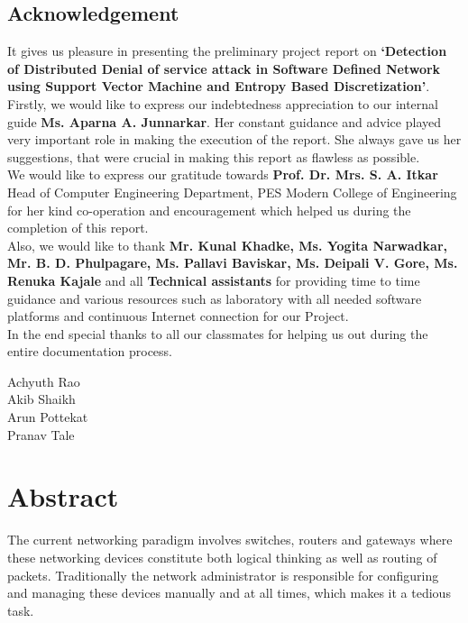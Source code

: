 \documentclass[12pt,a4paper,final]{report}
\begin{document}
\thispagestyle{empty}
\Large
\begin{center}
\chapter*{\centering Acknowledgement}
\end{center}
\normalsize
It gives us pleasure in presenting the preliminary project report on \textbf{`Detection of Distributed Denial of service attack in Software Defined Network using Support Vector Machine and Entropy Based Discretization'}.\\

Firstly, we would like to express our indebtedness appreciation to our internal guide \textbf{Ms. Aparna A. Junnarkar}. Her constant guidance and advice played very important role in making the execution of the report. She always gave us her suggestions, that were crucial in making this report as flawless as possible.\\

We would like to express our gratitude towards \textbf{Prof. Dr. Mrs. S. A. Itkar}  Head of Computer Engineering Department, PES Modern College of Engineering for her kind co-operation and encouragement which helped us during the completion of this report.\\

Also, we would like to thank \textbf{Mr. Kunal Khadke, Ms. Yogita Narwadkar, Mr. B. D. Phulpagare, Ms. Pallavi Baviskar, Ms. Deipali V. Gore, Ms. Renuka Kajale} and all \textbf{Technical assistants} for providing time to time guidance and various resources such as laboratory with all needed software platforms and continuous Internet connection for our Project.\\

In the end special thanks to all our classmates for helping us out during the entire documentation process.

\begin{flushright}
Achyuth Rao\\
Akib Shaikh\\
Arun Pottekat\\
Pranav Tale\\
\end{flushright}
\newpage

\pagestyle{plain} 
\cleardoublepage
{}
\tableofcontents
\newpage

\Large
\chapter*{\centering Abstract}
\normalsize
\noindent
The current networking paradigm involves switches, routers and gateways where these networking devices constitute both logical thinking as well as routing of packets. Traditionally the network administrator is responsible for configuring and managing these devices manually and at all times, which makes it a tedious task. 
\end{document}
